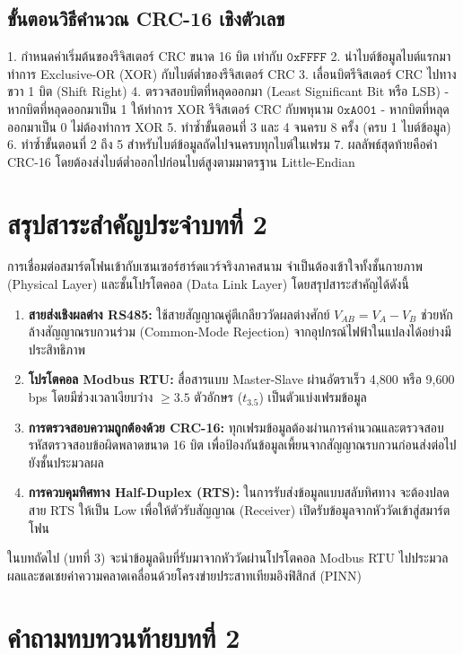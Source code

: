 \subsection{ขั้นตอนวิธีคำนวณ CRC-16 เชิงตัวเลข}
1. กำหนดค่าเริ่มต้นของรีจิสเตอร์ CRC ขนาด 16 บิต เท่ากับ $\mathtt{0xFFFF}$
2. นำไบต์ข้อมูลไบต์แรกมาทำการ Exclusive-OR (XOR) กับไบต์ต่ำของรีจิสเตอร์ CRC
3. เลื่อนบิตรีจิสเตอร์ CRC ไปทางขวา 1 บิต (Shift Right)
4. ตรวจสอบบิตที่หลุดออกมา (Least Significant Bit หรือ LSB)
   - หากบิตที่หลุดออกมาเป็น 1 ให้ทำการ XOR รีจิสเตอร์ CRC กับพหุนาม $\mathtt{0xA001}$
   - หากบิตที่หลุดออกมาเป็น 0 ไม่ต้องทำการ XOR
5. ทำซ้ำขั้นตอนที่ 3 และ 4 จนครบ 8 ครั้ง (ครบ 1 ไบต์ข้อมูล)
6. ทำซ้ำขั้นตอนที่ 2 ถึง 5 สำหรับไบต์ข้อมูลถัดไปจนครบทุกไบต์ในเฟรม
7. ผลลัพธ์สุดท้ายคือค่า CRC-16 โดยต้องส่งไบต์ต่ำออกไปก่อนไบต์สูงตามมาตรฐาน Little-Endian

\section{สรุปสาระสำคัญประจำบทที่ 2}

การเชื่อมต่อสมาร์ตโฟนเข้ากับเซนเซอร์ฮาร์ดแวร์จริงภาคสนาม จำเป็นต้องเข้าใจทั้งชั้นกายภาพ (Physical Layer) และชั้นโปรโตคอล (Data Link Layer) โดยสรุปสาระสำคัญได้ดังนี้
\begin{enumerate}
    \item \textbf{สายส่งเชิงผลต่าง RS485:} ใช้สายสัญญาณคู่ตีเกลียววัดผลต่างศักย์ $V_{AB} = V_A - V_B$ ช่วยหักล้างสัญญาณรบกวนร่วม (Common-Mode Rejection) จากอุปกรณ์ไฟฟ้าในแปลงได้อย่างมีประสิทธิภาพ
    \item \textbf{โปรโตคอล Modbus RTU:} สื่อสารแบบ Master-Slave ผ่านอัตราเร็ว 4,800 หรือ 9,600 bps โดยมีช่วงเวลาเงียบว่าง $\ge 3.5$ ตัวอักษร ($t_{3.5}$) เป็นตัวแบ่งเฟรมข้อมูล
    \item \textbf{การตรวจสอบความถูกต้องด้วย CRC-16:} ทุกเฟรมข้อมูลต้องผ่านการคำนวณและตรวจสอบรหัสตรวจสอบข้อผิดพลาดขนาด 16 บิต เพื่อป้องกันข้อมูลเพี้ยนจากสัญญาณรบกวนก่อนส่งต่อไปยังชั้นประมวลผล
    \item \textbf{การควบคุมทิศทาง Half-Duplex (RTS):} ในการรับส่งข้อมูลแบบสลับทิศทาง จะต้องปลดสาย RTS ให้เป็น Low เพื่อให้ตัวรับสัญญาณ (Receiver) เปิดรับข้อมูลจากหัววัดเข้าสู่สมาร์ตโฟน
\end{enumerate}

ในบทถัดไป (บทที่ 3) จะนำข้อมูลดิบที่รับมาจากหัววัดผ่านโปรโตคอล Modbus RTU ไปประมวลผลและชดเชยค่าความคลาดเคลื่อนด้วยโครงข่ายประสาทเทียมอิงฟิสิกส์ (PINN)

\section*{คำถามทบทวนท้ายบทที่ 2}

